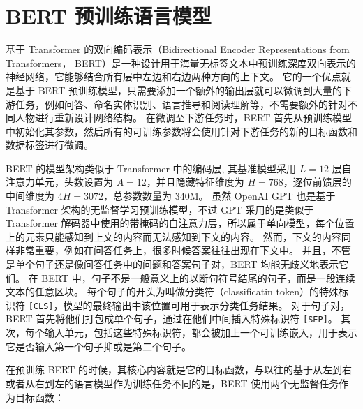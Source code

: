 \section{BERT 预训练语言模型}
基于 Transformer 的双向编码表示（Bidirectional Encoder Representations from Transformers， BERT）是一种设计用于海量无标签文本中预训练深度双向表示的神经网络，它能够结合所有层中左边和右边两种方向的上下文。
它的一个优点就是基于 BERT 预训练模型，只需要添加一个额外的输出层就可以微调到大量的下游任务，例如问答、命名实体识别、语言推导和阅读理解等，不需要额外的针对不同人物进行重新设计网络结构。
在微调至下游任务时，BERT 首先从预训练模型中初始化其参数，然后所有的可训练参数将会使用针对下游任务的新的目标函数和数据标签进行微调。

BERT 的模型架构类似于 Transformer 中的编码层, 其基准模型采用 $L=12$ 层自注意力单元，头数设置为 $A=12$，并且隐藏特征维度为 $H=768$，逐位前馈层的中间维度为 $4H = 3072$，总参数数量为 $340$M。
虽然 OpenAI GPT\cite{GPT} 也是基于 Transformer 架构的无监督学习预训练模型，不过 GPT 采用的是类似于 Transformer 解码器中使用的带掩码的自注意力层，所以属于单向模型，每个位置上的元素只能感知到上文的内容而无法感知到下文的内容。
然而，下文的内容同样非常重要，例如在问答任务上，很多时候答案往往出现在下文中。
并且，不管是单个句子还是像问答任务中的问题和答案句子对，BERT 均能无歧义地表示它们。
在 BERT 中，句子不是一般意义上的以断句符号结尾的句子，而是一段连续文本的任意区块。
每个句子的开头为叫做分类符（classificatin token）的特殊标识符 \texttt{[CLS]}，模型的最终输出中该位置可用于表示分类任务结果。
对于句子对，BERT 首先将他们打包成单个句子，通过在他们中间插入特殊标识符 \texttt{[SEP]}。
其次，每个输入单元，包括这些特殊标识符，都会被加上一个可训练嵌入，用于表示它是否输入第一个句子抑或是第二个句子。

在预训练 BERT 的时候，其核心内容就是它的目标函数，与以往的基于从左到右或者从右到左的语言模型作为训练任务不同的是，BERT 使用两个无监督任务作为目标函数：

